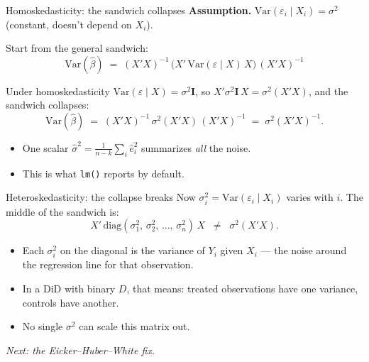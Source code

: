 \documentclass[aspectratio=169,11pt]{beamer}
\begin{document}
\begin{frame}{Homoskedasticity: the sandwich collapses}
\vspace{0.3em}
\textbf{Assumption.}\;\; $\text{Var}(\varepsilon_i \mid X_i) = \sigma^2$ \;(constant, doesn't depend on $X_i$).
\vspace{0.5em}

Start from the general sandwich:
\vspace{-0.2em}
\[
\text{Var}(\hat\beta) \;=\; (X'X)^{-1}\, \big(X' \,\text{Var}(\varepsilon \mid X)\, X\big)\, (X'X)^{-1}
\]
\vspace{-0.2em}

Under homoskedasticity $\text{Var}(\varepsilon \mid X) = \sigma^2 \mathbf{I}$, so $X'\sigma^2\mathbf{I}\,X = \sigma^2 (X'X)$, and the sandwich collapses:
\vspace{-0.2em}
\[
\text{Var}(\hat\beta) \;=\; (X'X)^{-1}\, \sigma^2(X'X)\, (X'X)^{-1} \;=\; \sigma^2 (X'X)^{-1}.
\]
\vspace{0.1em}
\begin{itemize}\small
  \item One scalar $\widehat\sigma^2 = \tfrac{1}{n-k}\sum_i \hat e_i^2$ summarizes \textit{all} the noise.
  \item This is what \texttt{lm()} reports by default. 
\end{itemize}
\end{frame}

\begin{frame}{Heteroskedasticity: the collapse breaks}
\vspace{0.5em}
Now $\sigma_i^2 = \text{Var}(\varepsilon_i \mid X_i)$ varies with $i$. The middle of the sandwich is:
\vspace{-0.2em}
\[
X'\, \text{diag}(\sigma_1^2, \,\sigma_2^2, \,\dots,\, \sigma_n^2)\, X \;\;\neq\;\; \sigma^2 (X'X).
\]
\vspace{-0.2em}
\begin{itemize}\small
  \item Each $\sigma_i^2$ on the diagonal is the variance of $Y_i$ given $X_i$ --- the noise around the regression line for that observation.
  \item In a DiD with binary $D$, that means: treated observations have one variance, controls have another.
  \item No single $\sigma^2$ can scale this matrix out. 
\end{itemize}
\vspace{0.3em}
\begin{center}
\small\color{warmgray}\itshape Next: the Eicker--Huber--White fix.
\end{center}
\end{frame}
\end{document}
